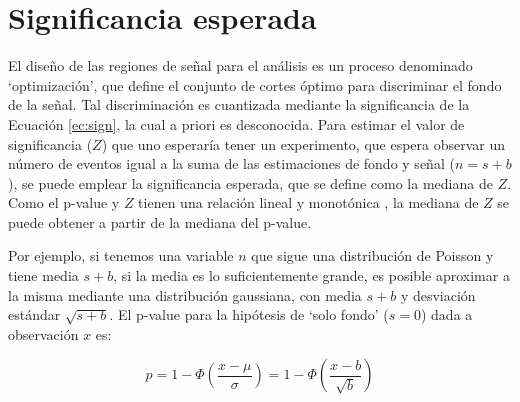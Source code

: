 
 

\section{Significancia esperada}\label{sec:exp_sig}

El diseño de las regiones de señal para el análisis es un proceso denominado `optimización', que define el conjunto de cortes óptimo para discriminar el fondo de la señal. Tal discriminación es cuantizada mediante la significancia de la Ecuación \ref{ec:sign}, la cual a priori es desconocida. Para estimar el valor de significancia ($Z$) que uno esperaría tener un experimento, que espera observar un número de eventos igual a la suma de las estimaciones de fondo y señal ($n=s+b$), se puede emplear la significancia esperada, que se define como la mediana de $Z$. Como el p-value y $Z$ tienen una relación lineal y monotónica \cite{Cowan:2010js}, la mediana de $Z$ se puede obtener a partir de la mediana del p-value.


Por ejemplo, si tenemos una variable $n$ que sigue una distribución de Poisson y tiene media $s+b$, si la media es lo suficientemente grande, es posible aproximar a la misma mediante una distribución gaussiana, con media $s+b$ y desviación estándar $\sqrt{s+b}$. El p-value para la hipótesis de `solo fondo' ($s=0$) dada a observación $x$ es:

\begin{equation}
	p = 1 - \Phi\left( \frac{x-\mu}{\sigma} \right) = 1 - \Phi\left( \frac{x-b}{\sqrt{b}} \right)
\end{equation}

